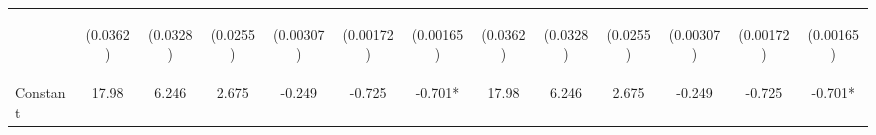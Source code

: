\documentclass[]{article}
\begin{document}
\begin{center}
\begin{tabular}{lcccccccccccc}
\vspace{4pt} & \begin{footnotesize}(0.0362)\end{footnotesize} & \begin{footnotesize}(0.0328)\end{footnotesize} & \begin{footnotesize}(0.0255)\end{footnotesize} & \begin{footnotesize}(0.00307)\end{footnotesize} & \begin{footnotesize}(0.00172)\end{footnotesize} & \begin{footnotesize}(0.00165)\end{footnotesize} & \begin{footnotesize}(0.0362)\end{footnotesize} & \begin{footnotesize}(0.0328)\end{footnotesize} & \begin{footnotesize}(0.0255)\end{footnotesize} & \begin{footnotesize}(0.00307)\end{footnotesize} & \begin{footnotesize}(0.00172)\end{footnotesize} & \begin{footnotesize}(0.00165)\end{footnotesize} \\
Constant & 17.98 & 6.246 & 2.675 & -0.249 & -0.725 & -0.701* & 17.98 & 6.246 & 2.675 & -0.249 & -0.725 & -0.701* \\

\end{tabular}
\end{center}
\end{document}
